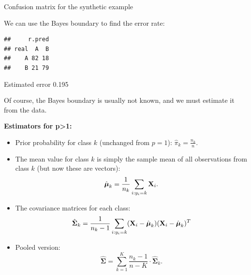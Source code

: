 \documentclass[
  10pt,
  ignorenonframetext,
]{beamer}
\newenvironment{Shaded}{\begin{snugshade}}{\end{snugshade}}
\newcommand{\AttributeTok}[1]{\textcolor[rgb]{0.13,0.29,0.53}{#1}}
\newcommand{\DecValTok}[1]{\textcolor[rgb]{0.00,0.00,0.81}{#1}}
\newcommand{\FunctionTok}[1]{\textcolor[rgb]{0.13,0.29,0.53}{\textbf{#1}}}
\newcommand{\NormalTok}[1]{#1}
\newcommand{\OtherTok}[1]{\textcolor[rgb]{0.56,0.35,0.01}{#1}}
\newcommand{\SpecialCharTok}[1]{\textcolor[rgb]{0.81,0.36,0.00}{\textbf{#1}}}
\newcommand{\StringTok}[1]{\textcolor[rgb]{0.31,0.60,0.02}{#1}}
\begin{document}
\begin{frame}[fragile]
\begin{block}{Confusion matrix for the synthetic example}
\protect\hypertarget{confusion-matrix-for-the-synthetic-example}{}
\vspace{2mm}

We can use the Bayes boundary to find the error rate:

\vspace{2mm}

\scriptsize

\begin{Shaded}
\end{Shaded}

\begin{verbatim}
##     r.pred
## real  A  B
##    A 82 18
##    B 21 79
\end{verbatim}

Estimated error 0.195

\vspace{6mm}

\normalsize

Of course, the Bayes boundary is usually not known, and we must estimate
it from the data.
\end{block}
\end{frame}

\begin{frame}
\textbf{Estimators for p\textgreater1:}

\begin{itemize}
\item
  Prior probability for class \(k\) (unchanged from \(p=1\)):
  \(\hat{\pi}_k = \frac{n_k}{n}.\)
\item
  The mean value for class \(k\) is simply the sample mean of all
  observations from class \(k\) (but now these are vectors):
  \[\hat{\boldsymbol{\mu}}_k = \frac{1}{n_k}\sum_{i:y_i=k} {\bf X}_i.\]
\item
  The covariance matrices for each class:
  \[\hat{\boldsymbol{\Sigma}}_k=\frac{1}{n_k-1}\sum_{i:y_i=k} ({\bf X}_i-\hat{\boldsymbol{\mu}}_k ) ({\bf X}_i-\hat{\boldsymbol{\mu}}_k)^T\]
\item
  Pooled version:
  \[\hat{\boldsymbol{\Sigma}}= \sum_{k=1}^K \frac{n_k - 1}{n - K} \cdot \hat{\boldsymbol{\Sigma}}_k.\]
\end{itemize}
\end{frame}
\end{document}
